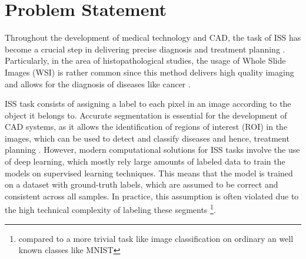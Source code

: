\section{Problem Statement}\label{sec:state_of_art}



Throughout the development of medical technology and \gls{CAD}, the
task of \gls{ISS} has become a crucial step in delivering precise diagnosis
and treatment planning \cite{Giri_Bhatia_2024}. Particularly, in the
area of histopathological studies, the usage of Whole Slide Images
(\gls{WSI}) is rather common since this method delivers high quality
imaging and allows for the diagnosis of diseases like cancer
\cite{YujiaEtAl2024}.

\gls{ISS} task consists of assigning a label to each pixel
in an image according to the object it belongs to. Accurate
segmentation is essential for the development of \gls{CAD} systems,
as it allows the identification of regions of interest (\gls{ROI}) in
the images, which can be used to detect and classify diseases and
hence, treatment planning \cite{Sarvamangala2022}. However, modern computational
solutions for \gls{ISS} tasks involve the use of deep learning, which
mostly rely large amounts of labeled data to train the models
on supervised learning techniques. This means that the model is trained on
a dataset with ground-truth labels, which are assumed to be correct
and consistent across all samples. In practice, this assumption is
often violated due to the high technical complexity of labeling these
segments \footnote{compared to a more trivial task like image classification
on ordinary an well known classes like MNIST}.



